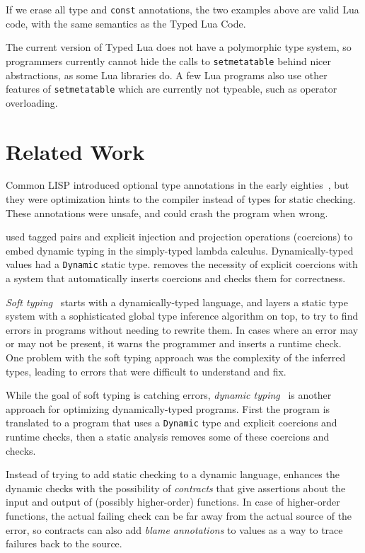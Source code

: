 \documentclass[preprint]{sig-alternate}
\begin{document}
If we erase all type and {\tt const} annotations, the
two examples above are valid Lua code, with the same
semantics as the Typed Lua Code.

The current version of Typed Lua does not have a polymorphic
type system, so programmers currently cannot hide the
calls to {\tt setmetatable} behind nicer abstractions, as
some Lua libraries do. A few Lua programs also use
other features of {\tt setmetatable} which are currently
not typeable, such as operator overloading.

\section{Related Work}
\label{sec:review}

Common LISP introduced optional type annotations in the early
eighties~\citep{steele1982ocl}, but they were optimization
hints to the compiler instead of types for static checking.
These annotations were unsafe, and could crash the program
when wrong.

\citet{abadi1989dts} used tagged pairs and explicit
injection and projection operations (coercions) to embed dynamic
typing in the simply-typed lambda calculus. Dynamically-typed
values had a {\tt Dynamic} static type. \citet{thatte1990qst}
removes the necessity of explicit coercions with a system
that automatically inserts coercions and checks them for
correctness.

\textit{Soft typing}~\citep{cartwright1991soft} starts
with a dynamically-typed language, and layers a static
type system with a sophisticated global type inference
algorithm on top, to try to find errors in programs
without needing to rewrite them. In cases where an error
may or may not be present, it warns the programmer and
inserts a runtime check. One problem with the soft
typing approach was the complexity of the inferred
types, leading to errors that were difficult to understand
and fix.

While the goal of soft typing is catching errors,
\textit{dynamic typing}~\citep{henglein1994dts} is
another approach for optimizing dynamically-typed programs.
First the program is translated to a program that uses
a {\tt Dynamic} type and explicit coercions and runtime checks,
then a static analysis removes some  of these coercions and
checks.

Instead of trying to add static checking to a dynamic
language, \citet{findler2002chf} enhances
the dynamic checks with the possibility of {\em contracts}
that give assertions about the input and output of (possibly
higher-order) functions. In case of higher-order functions,
the actual failing check can be far away from the actual
source of the error, so contracts can also add {\em blame
annotations} to values as a way to trace failures back to
the source.
\end{document}
